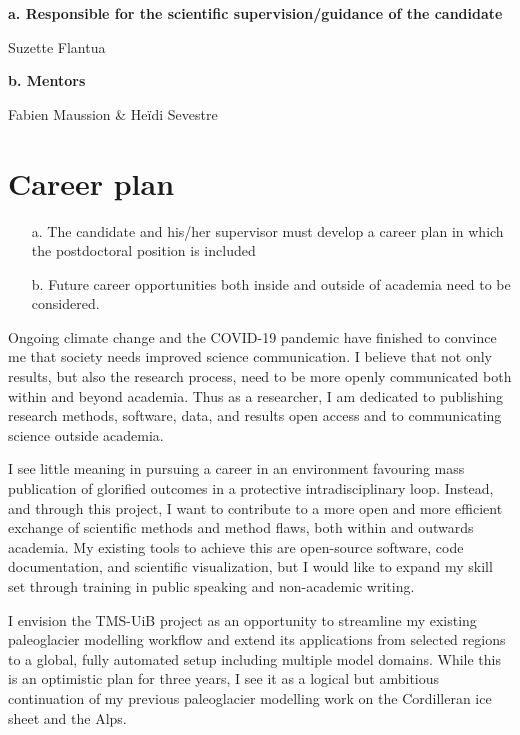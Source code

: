 \documentclass{article}
\newcommand{\guideline}[1]{{\color{color2}\itshape{#1}}}
\begin{document}
    \textbf{a. Responsible for the scientific supervision/guidance of the
            candidate}

    Suzette Flantua

    \textbf{b. Mentors}

    Fabien Maussion \& Heïdi Sevestre


\section{Career plan}

    \guideline{
        \begin{itemize}
          \item[a.] The candidate and his/her supervisor must develop a career
            plan in which the postdoctoral position is included
          \item[b.] Future career opportunities both inside and outside of
            academia need to be considered.
        \end{itemize}}

    Ongoing climate change and the COVID-19 pandemic have finished to convince
    me that society needs improved science communication. I believe that not
    only results, but also the research process, need to be more openly
    communicated both within and beyond academia. Thus as a researcher, I am
    dedicated to publishing research methods, software, data, and
    results open access and to communicating science outside academia.

    I see little meaning in pursuing a career in an environment favouring mass
    publication of glorified outcomes in a protective intradisciplinary loop.
    Instead, and through this project, I want to contribute to a more open and
    more efficient exchange of scientific methods and method flaws,
    both within and outwards academia. My existing
    tools to achieve this are open-source software, code documentation, and
    scientific visualization, but I would like to expand my skill set through
    training in public speaking and non-academic writing.

    I envision the TMS-UiB project as an opportunity to
    streamline my existing paleoglacier modelling workflow and extend its
    applications from selected regions to a global, fully automated setup including
    multiple model domains. While this is an optimistic plan for three years, I
    see it as a logical but ambitious continuation of my previous paleoglacier
    modelling work on the Cordilleran ice sheet and the Alps.
\end{document}
